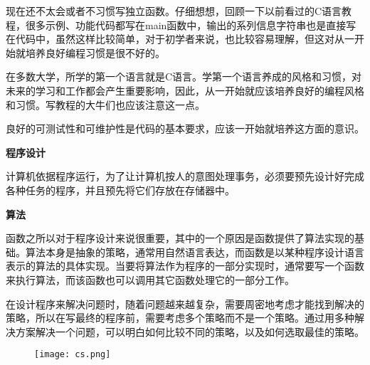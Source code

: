 现在还不太会或者不习惯写独立函数。仔细想想，回顾一下以前看过的C语言教程，很多示例、功能代码都写在main函数中，输出的系列信息字符串也是直接写在代码中，虽然这样比较简单，对于初学者来说，也比较容易理解，但这对从一开始就培养良好编程习惯是很不好的。

在多数大学，所学的第一个语言就是C语言。学第一个语言养成的风格和习惯，对未来的学习和工作都会产生重要影响，因此，从一开始就应该培养良好的编程风格和习惯。写教程的大牛们也应该注意这一点。

良好的可测试性和可维护性是代码的基本要求，应该一开始就培养这方面的意识。

\textbf{程序设计}

计算机依据程序运行，为了让计算机按人的意图处理事务，必须要预先设计好完成各种任务的程序，并且预先将它们存放在存储器中。

\textbf{算法}

函数之所以对于程序设计来说很重要，其中的一个原因是函数提供了算法实现的基础。算法本身是抽象的策略，通常用自然语言表达，而函数是以某种程序设计语言表示的算法的具体实现。当要将算法作为程序的一部分实现时，通常要写一个函数来执行算法，而该函数也可以调用其它函数处理它的一部分工作。

在设计程序来解决问题时，随着问题越来越复杂，需要周密地考虑才能找到解决的策略，所以在写最终的程序前，需要考虑多个策略而不是一个策略。通过用多种解决方案解决一个问题，可以明白如何比较不同的策略，以及如何选取最佳的策略。

\begin{figure}[!ht]
\centering
\texttt{[image: cs.png]}
\label{cs}
\end{figure}



































